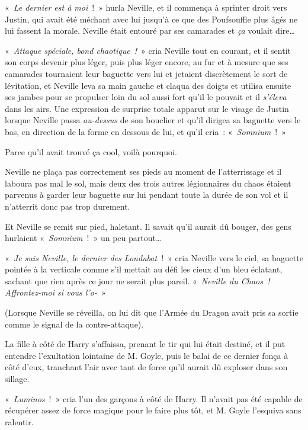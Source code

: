«~\emph{Le dernier est à moi}~!~» hurla Neville, et il commença à sprinter droit vers Justin, qui avait été méchant avec lui jusqu'à ce que des Poufsouffle plus âgés ne lui fassent la morale. Neville était entouré par ses camarades et \emph{ça} voulait dire…

«~\emph{Attaque spéciale, bond chaotique~!}~» cria Neville tout en courant, et il sentit son corps devenir plus léger, puis plus léger encore, au fur et à mesure que ses camarades tournaient leur baguette vers lui et jetaient discrètement le sort de lévitation, et Neville leva sa main gauche et claqua des doigts et utilisa ensuite ses jambes pour se propulser loin du sol aussi fort qu'il le pouvait et il \emph{s'éleva} dans les airs. Une expression de surprise totale apparut sur le visage de Justin lorsque Neville passa \emph{au-dessus} de son bouclier et qu'il dirigea sa baguette vers le bas, en direction de la forme en dessous de lui, et qu'il cria~: «~\emph{Somnium}~!~»

Parce qu'il avait trouvé ça cool, voilà pourquoi.

Neville ne plaça pas correctement ses pieds au moment de l'atterrissage et il laboura pas mal le sol, mais deux des trois autres légionnaires du chaos étaient parvenus à garder leur baguette sur lui pendant toute la durée de son vol et il n'atterrit donc pas trop durement.

Et Neville se remit sur pied, haletant. Il savait qu'il aurait dû bouger, des gens hurlaient «~\emph{Somnium}~!~» un peu partout…

«~\emph{Je suis Neville, le dernier des Londubat}~!~» cria Neville vers le ciel, sa baguette pointée à la verticale comme s'il mettait au défi les cieux d'un bleu éclatant, sachant que rien après ce jour ne serait plus pareil. «~\emph{Neville du Chaos~! Affrontez-moi si vous l'o-}~»

(Lorsque Neville se réveilla, on lui dit que l'Armée du Dragon avait pris sa sortie comme le signal de la contre-attaque).

\later

La fille à côté de Harry s'affaissa, prenant le tir qui lui était destiné, et il put entendre l'exultation lointaine de M. Goyle, puis le balai de ce dernier fonça à côté d'eux, tranchant l'air avec tant de force qu'il aurait dû exploser dans son sillage.

«~\emph{Luminos}~!~» cria l'un des garçons à côté de Harry. Il n'avait pas été capable de récupérer assez de force magique pour le faire plus tôt, et M. Goyle l'esquiva sans ralentir.

